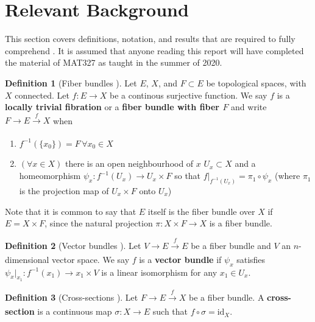 \documentclass[12pt]{article}
\theoremstyle{definition}
\newtheorem{defn}{Definition}
\begin{document}
\section{Relevant Background}
This section covers definitions, notation, and results that are required to
fully comprehend \cite{topology-robot-arm}. It is assumed that anyone reading
this report will have completed the material of MAT327 as taught in the summer
of 2020.

\begin{defn}[Fiber bundles \cite{topology-fiber-bundles}]
    Let \(E\), \(X\), and \(F \subset E\) be topological spaces, 
    with \(X\) connected.
    Let \(f : E \rightarrow X\) be a continous surjective function. 
    We say \(f\) is a \textbf{locally trivial fibration} or a 
    \textbf{fiber bundle with fiber \(F\)} and write 
    \(F \rightarrow E \xrightarrow[]{f} X\) when
    \begin{enumerate}
        \item \(f^{-1}(\{x_0\}) = F \, \forall x_0 \in X\)
        \item \((\forall x \in X)\) there is an open neighbourhood of \(x\)
            \(U_x \subset X\) and a homeomorphism
            \(\psi_x : f^{-1}(U_x) \rightarrow U_x \times F\) so that
            \(f\vert_{f^{-1}(U_x)} = \pi_1 \circ \psi_x\) (where \(\pi_1\)
            is the projection map of \(U_x \times F\) onto \(U_x\))
    \end{enumerate}
    Note that it is common to say that \(E\) itself is the fiber bundle over
    \(X\) if \(E = X \times F\), since the natural projection 
    \(\pi : X \times F \rightarrow X\) is a fiber bundle.
\end{defn}

\begin{defn}[Vector bundles \cite{topology-fiber-bundles}]
    Let \(V \rightarrow E \xrightarrow[]{f} E\) be a fiber bundle and \(V\) an
    \(n\)-dimensional vector space. We say \(f\) is a
    \textbf{vector bundle} if \(\psi_x\) satisfies
    \(\psi_x \vert_{x_1} : f^{-1}(x_1) \rightarrow {x_1}\times V\) is a linear
    isomorphism for any \(x_1 \in U_x\).
\end{defn}

\begin{defn}[Cross-sections \cite{topology-fiber-bundles}]
    Let \(F \rightarrow E \xrightarrow[]{f} X\) be a fiber bundle.
    A \textbf{cross-section} is a continuous map \(\sigma : X \rightarrow E\)
    such that \(f \circ \sigma = \text{id}_X\).
\end{defn}
\end{document}
